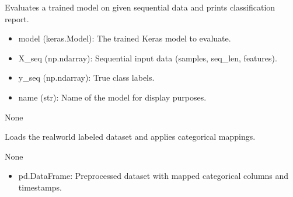\documentclass[letterpaper,10pt,english]{sphinxmanual}
\begin{document}
\begin{fulllineitems}
\label{\detokenize{lstm_results_real_data:lstm_results_real_data.evaluate_model}}
\pysigstartsignatures
{}
\pysigstopsignatures
\sphinxAtStartPar
Evaluates a trained model on given sequential data and prints classification report.
\begin{description}
\begin{itemize}
\item {} 
\sphinxAtStartPar
model (keras.Model): The trained Keras model to evaluate.

\item {} 
\sphinxAtStartPar
X\_seq (np.ndarray): Sequential input data (samples, seq\_len, features).

\item {} 
\sphinxAtStartPar
y\_seq (np.ndarray): True class labels.

\item {} 
\sphinxAtStartPar
name (str): Name of the model for display purposes.

\end{itemize}

\sphinxAtStartPar
None

\end{description}

\end{fulllineitems}


\begin{fulllineitems}
\label{\detokenize{lstm_results_real_data:lstm_results_real_data.load_and_preprocess_data}}
\pysigstartsignatures
{}
\pysigstopsignatures
\sphinxAtStartPar
Loads the real\sphinxhyphen{}world labeled dataset and applies categorical mappings.
\begin{description}
\sphinxAtStartPar
None

\begin{itemize}
\item {} 
\sphinxAtStartPar
pd.DataFrame: Preprocessed dataset with mapped categorical columns and timestamps.

\end{itemize}

\end{description}

\end{fulllineitems}
\end{document}
